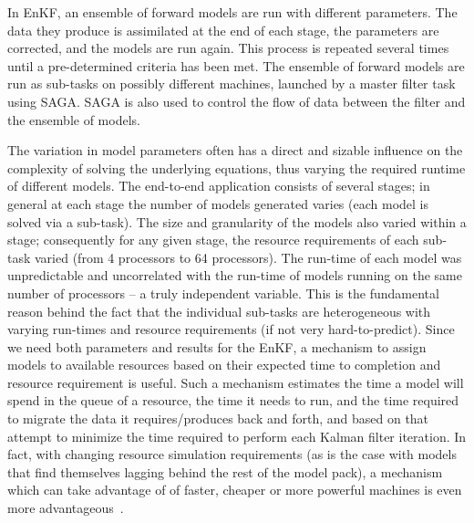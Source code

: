\documentclass[conference,final]{IEEEtran}
\begin{document}
In EnKF, an ensemble of forward models are run with
different parameters. The data they produce is assimilated at the end
of each stage, the parameters are corrected, and the models are run
again. This process is repeated several times until a pre-determined
criteria has been met. The ensemble of forward models are run as
sub-tasks on possibly different machines, launched by a master filter
task using SAGA. SAGA is also used to control the flow of data between
the filter and the ensemble of models.

The variation in model parameters often has a direct and sizable
influence on the complexity of solving the underlying equations, thus
varying the required runtime of different models.  The end-to-end
application consists of several stages; in general at each stage the
number of models generated varies (each model is solved via a
sub-task). The size and granularity of the models also varied within a
stage; consequently for any given stage, the resource requirements of
each sub-task varied (from 4 processors to 64 processors). The
run-time of each model was unpredictable and uncorrelated with the
run-time of models running on the same number of processors – a truly
independent variable.  This is the fundamental reason behind the fact
that the individual sub-tasks are heterogeneous with varying run-times
and resource requirements (if not very hard-to-predict).  Since we
need both parameters and results for the EnKF, a mechanism to assign
models to available resources based on their expected time to
completion and resource requirement is useful.  Such a mechanism
estimates the time a model will spend in the queue of a resource, the
time it needs to run, and the time required to migrate the data it
requires/produces back and forth, and based on that attempt to
minimize the time required to perform each Kalman filter iteration.
In fact, with changing resource simulation requirements (as is the
case with models that find themselves lagging behind the rest of the
model pack), a mechanism which can take advantage of of faster,
cheaper or more powerful machines is even more
advantageous~\cite{escience07}.
\end{document}
